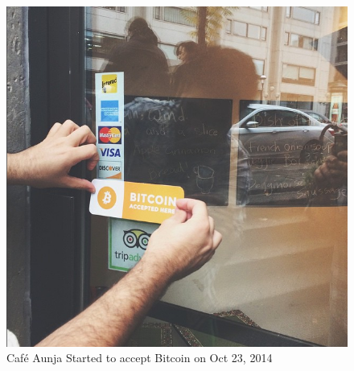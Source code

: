 \begin{figure}[htb!p]
\centering
\includegraphics[scale=0.5]{fig/cafeaunja.png}
  \caption{Caf\'{e} Aunja Started to accept Bitcoin on Oct 23, 2014 }
\label{fig:cafeaunja}
\end{figure}

